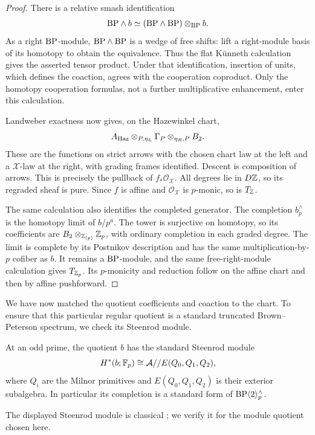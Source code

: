 \begin{proof}
There is a relative smash identification
\[
 \mathrm{BP}\wedge b\simeq
 (\mathrm{BP}\wedge\mathrm{BP})\otimes_{\mathrm{BP}}b.
\]
As a right $\mathrm{BP}$-module, $\mathrm{BP}\wedge\mathrm{BP}$ is a wedge of free shifts:
lift a right-module basis of its homotopy to obtain the equivalence.
Thus the flat K\"unneth calculation gives the asserted tensor product.
Under that identification, insertion of units, which defines the
coaction, agrees with the cooperation coproduct. Only the homotopy
cooperation formulas, not a further multiplicative enhancement, enter
this calculation.

Landweber exactness now gives, on the Hazewinkel chart,
\[
 A_{\rm Haz}\otimes_{P,\eta_L}\Gamma_P
                  \otimes_{\eta_R,P}B_2.
\]
These are the functions on strict arrows with the chosen chart law at
the left and a $\mathcal X$-law at the right, with grading frames
identified. Descent is composition of arrows. This is precisely the
pullback of $f_*\mathcal O_{\mathcal X}$. All degrees lie in
$D\mathbb Z$, so its regraded sheaf is pure. Since $f$ is affine and
$\mathcal O_{\mathcal X}$ is $p$-monic, so is $T_{\mathbb Z}$.

The same calculation also identifies the completed generator. The
completion $b_p^\wedge$ is the homotopy limit of $b/p^a$.
The tower is surjective on homotopy, so its coefficients are
$B_2\otimes_{\mathbb Z_{(p)}}\mathbb Z_p$, with ordinary completion in each
graded degree. The limit is complete by its Postnikov description and
has the same multiplication-by-$p$ cofiber as $b$. It remains a
$\mathrm{BP}$-module, and the same free-right-module calculation gives
$T_{\mathbb Z_p}$. Its $p$-monicity and reduction follow on the affine chart
and then by affine pushforward.
\end{proof}

We have now matched the quotient coefficients and coaction to the
chart. To ensure that this particular regular quotient is a standard
truncated Brown--Peterson spectrum, we check its Steenrod module.

\begin{proposition}
\label{comp:standard-cohomology}
At an odd prime, the quotient $b$ has the standard Steenrod module
\[
 H^*(b;\mathbb F_p)\cong
 \mathcal A//E(Q_0,Q_1,Q_2),
\]
where $Q_i$ are the Milnor primitives and $E(Q_0,Q_1,Q_2)$ is their
exterior subalgebra. In particular its completion is a standard form
of $\mathrm{BP}\langle2\rangle_p^\wedge$.
\end{proposition}

The displayed Steenrod module is classical
\cite[Proposition~1.7]{Wilson1975}; we verify it for the module quotient
chosen here.

